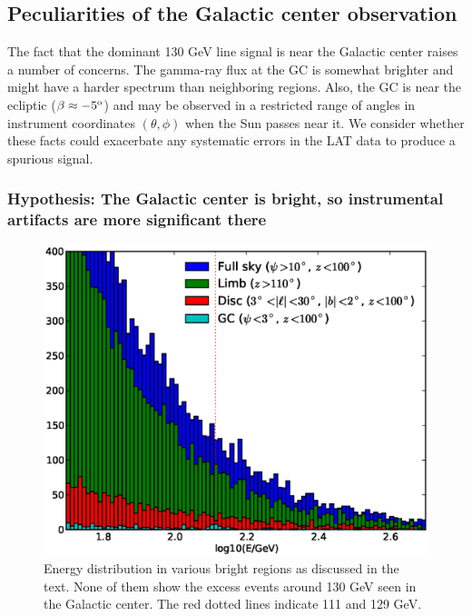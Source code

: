 \documentclass[aps,twocolumn,prd,superscriptaddress,showpacs,nofootinbib,fixfloat]{revtex4}
\newcommand{\degree}{^{\rm o}}
\begin{document}
\subsection{Peculiarities of the Galactic center observation}
The fact that the dominant 130 GeV line signal is near the
Galactic center raises a number of concerns.  The gamma-ray
flux at the GC is somewhat brighter and might have a harder
spectrum than neighboring regions. Also, the GC is near the
ecliptic ($\beta \approx -5\degree$) and may be observed in
a restricted range of angles in instrument coordinates
$(\theta, \phi)$ when the Sun passes near it.  We consider
whether these facts could exacerbate any systematic errors
in the LAT data to produce a spurious signal.

\subsubsection{Hypothesis: The Galactic center is bright, so
instrumental artifacts are more significant there}

\begin{figure}
  \centering
  \includegraphics[width=1.0\linewidth]{plots/target_spectra.eps}
  \caption{Energy distribution in various bright regions as
  discussed in the text. None of them show the excess events
  around 130 GeV seen in the Galactic center. The red dotted
  lines indicate 111 and 129 GeV.}
  \label{fig:target_spectra}
\end{figure}
\end{document}
